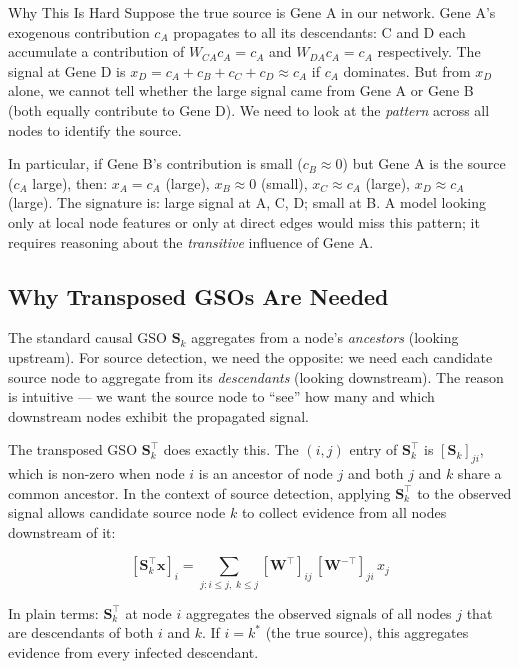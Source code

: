 \begin{examplebox}{Why This Is Hard}
Suppose the true source is Gene A in our network. Gene A's exogenous
contribution $c_A$ propagates to all its descendants: C and D each accumulate
a contribution of $W_{CA} c_A = c_A$ and $W_{DA} c_A = c_A$ respectively.
The signal at Gene D is $x_D = c_A + c_B + c_C + c_D \approx c_A$ if $c_A$
dominates. But from $x_D$ alone, we cannot tell whether the large signal came
from Gene A or Gene B (both equally contribute to Gene D). We need to look at
the \emph{pattern} across all nodes to identify the source.

In particular, if Gene B's contribution is small ($c_B \approx 0$) but Gene A
is the source ($c_A$ large), then: $x_A = c_A$ (large), $x_B \approx 0$ (small),
$x_C \approx c_A$ (large), $x_D \approx c_A$ (large). The signature is:
large signal at A, C, D; small at B. A model looking only at local node
features or only at direct edges would miss this pattern; it requires reasoning
about the \emph{transitive} influence of Gene A.
\end{examplebox}

\subsection{Why Transposed GSOs Are Needed}

The standard causal GSO $\mathbf{S}_k$ aggregates from a node's \emph{ancestors}
(looking upstream). For source detection, we need the opposite: we need each
candidate source node to aggregate from its \emph{descendants} (looking
downstream). The reason is intuitive --- we want the source node to ``see''
how many and which downstream nodes exhibit the propagated signal.

The transposed GSO $\mathbf{S}_k^\top$ does exactly this. The $(i,j)$ entry of
$\mathbf{S}_k^\top$ is $[\mathbf{S}_k]_{ji}$, which is non-zero when node $i$
is an ancestor of node $j$ and both $j$ and $k$ share a common ancestor. In the
context of source detection, applying $\mathbf{S}_k^\top$ to the observed signal
allows candidate source node $k$ to collect evidence from all nodes downstream
of it:

\[
    [\mathbf{S}_k^\top \mathbf{x}]_i = \sum_{j: i \le j,\; k \le j}
    [\mathbf{W}^\top]_{ij} \, [\mathbf{W}^{-\top}]_{ji} \, x_j
\]

In plain terms: $\mathbf{S}_k^\top$ at node $i$ aggregates the observed signals
of all nodes $j$ that are descendants of both $i$ and $k$. If $i = k^*$ (the
true source), this aggregates evidence from every infected descendant.

